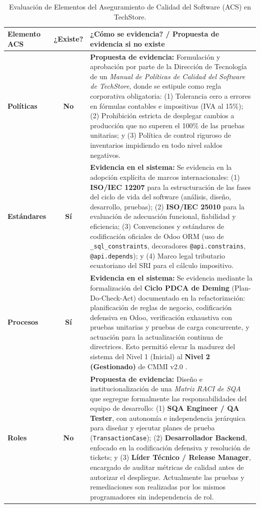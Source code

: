 \documentclass{article}
\begin{document}
\begin{table}[H]
\centering
\small
\caption{Evaluación de Elementos del Aseguramiento de Calidad del Software (ACS) en TechStore.}
\label{tab:evaluacion_acs}
\renewcommand{\arraystretch}{1.25}
\begin{tabularx}{\textwidth}{p{2.6cm}cp{10.2cm}}
\toprule
\textbf{Elemento ACS} & \textbf{¿Existe?} & \textbf{¿Cómo se evidencia? / Propuesta de evidencia si no existe} \\
\midrule
\textbf{Políticas} & \textbf{No} & 
\textbf{Propuesta de evidencia:} Formulación y aprobación por parte de la Dirección de Tecnología de un \textit{Manual de Políticas de Calidad del Software de TechStore}, donde se estipule como regla corporativa obligatoria: (1) Tolerancia cero a errores en fórmulas contables e impositivas (IVA al 15\%); (2) Prohibición estricta de desplegar cambios a producción que no superen el 100\% de las pruebas unitarias; y (3) Política de control riguroso de inventarios impidiendo en todo nivel saldos negativos. \\
\midrule
\textbf{Estándares} & \textbf{Sí} & 
\textbf{Evidencia en el sistema:} Se evidencia en la adopción explícita de marcos internacionales: (1) \textbf{ISO/IEC 12207} \cite{iso12207} para la estructuración de las fases del ciclo de vida del software (análisis, diseño, desarrollo, pruebas); (2) \textbf{ISO/IEC 25010} \cite{iso25010} para la evaluación de adecuación funcional, fiabilidad y eficiencia; (3) Convenciones y estándares de codificación oficiales de Odoo ORM (uso de \texttt{\_sql\_constraints}, decoradores \texttt{@api.constrains}, \texttt{@api.depends}); y (4) Marco legal tributario ecuatoriano del SRI para el cálculo impositivo. \\
\midrule
\textbf{Procesos} & \textbf{Sí} & 
\textbf{Evidencia en el sistema:} Se evidencia mediante la formalización del \textbf{Ciclo PDCA de Deming} (Plan-Do-Check-Act) \cite{deming1986} documentado en la refactorización: planificación de reglas de negocio, codificación defensiva en Odoo, verificación exhaustiva con pruebas unitarias y pruebas de carga concurrente, y actuación para la actualización continua de directrices. Esto permitió elevar la madurez del sistema del Nivel 1 (Inicial) al \textbf{Nivel 2 (Gestionado)} de CMMI v2.0 \cite{cmmi2018}. \\
\midrule
\textbf{Roles} & \textbf{No} & 
\textbf{Propuesta de evidencia:} Diseño e institucionalización de una \textit{Matriz RACI de SQA} que segregue formalmente las responsabilidades del equipo de desarrollo: (1) \textbf{SQA Engineer / QA Tester}, con autonomía e independencia jerárquica para diseñar y ejecutar planes de prueba (\texttt{TransactionCase}); (2) \textbf{Desarrollador Backend}, enfocado en la codificación defensiva y resolución de tickets; y (3) \textbf{Líder Técnico / Release Manager}, encargado de auditar métricas de calidad antes de autorizar el despliegue. Actualmente las pruebas y remediaciones son realizadas por los mismos programadores sin independencia de rol. \\

\end{tabularx}
\end{table}
\end{document}
